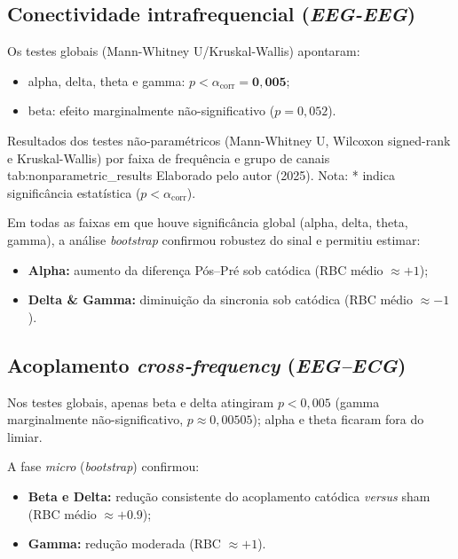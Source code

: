\subsection{Conectividade intrafrequencial (\emph{EEG-EEG})}

Os testes globais (Mann-Whitney U/Kruskal-Wallis) apontaram:
\begin{itemize}
  \item alpha, delta, theta e gamma: $p<\alpha_{\mathrm{corr}}=\mathbf{0{,}005}$;
  \item beta: efeito marginalmente não-significativo ($p=0{,}052$).
\end{itemize}

{Resultados dos testes não-paramétricos (Mann-Whitney U, Wilcoxon signed-rank e Kruskal-Wallis) por faixa de frequência e grupo de canais}
{tab:nonparametric_results}
{Elaborado pelo autor (2025). Nota: * indica significância estatística ($p < \alpha_{\mathrm{corr}}$).}

Em todas as faixas em que houve significância global (alpha, delta, theta, gamma), a análise \emph{bootstrap} confirmou robustez do sinal e permitiu estimar:
\begin{itemize}
  \item \textbf{Alpha:} aumento da diferença Pós–Pré sob catódica (RBC médio $\approx+1$);
  \item \textbf{Delta \& Gamma:} diminuição da sincronia sob catódica (RBC médio $\approx-1$).
\end{itemize}

\subsection{Acoplamento \emph{cross‐frequency} (\emph{EEG–ECG})}

Nos testes globais, apenas beta e delta atingiram $p<0{,}005$ (gamma marginalmente não-significativo, $p\approx0{,}00505$); alpha e theta ficaram fora do limiar.

A fase \emph{micro} (\emph{bootstrap}) confirmou:
\begin{itemize}
  \item \textbf{Beta e Delta:} redução consistente do acoplamento catódica \textit{versus} sham (RBC médio $\approx+0.9$);
  \item \textbf{Gamma:} redução moderada (RBC $\approx+1$).
\end{itemize}

